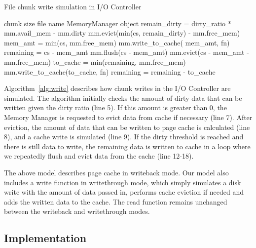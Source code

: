 \documentclass[conference]{IEEEtran}
\newcommand{\Desc}[2]{\State \makebox[2em][l]{#1}#2}
\begin{document}
    \begin{algorithm}\caption{File chunk write simulation in I/O Controller}
    \label{alg:write}
        \small
        \begin{algorithmic}[1]
        \Input
            \Desc{cs}{chunk size}
            \Desc{fn}{file name}
            \Desc{mm}{MemoryManager object}
           \EndInput
        \State remain\_dirty = dirty\_ratio * mm.avail\_mem - mm.dirty
         
            \State mm.evict(min(cs, remain\_dirty) - mm.free\_mem)
            \State mem\_amt = min(cs, mm.free\_mem)
            \State mm.write\_to\_cache( mem\_amt, fn)
        \EndIf
        \State remaining = cs - mem\_amt
          
            \State mm.flush(cs - mem\_amt)
            \State mm.evict(cs - mem\_amt  - mm.free\_mem)
            \State to\_cache = min(remaining, mm.free\_mem)
            \State mm.write\_to\_cache(to\_cache, fn)
            \State remaining = remaining - to\_cache
        \EndWhile

        \end{algorithmic}
    \end{algorithm}
    Algorithm~\ref{alg:write} describes how chunk writes in
    the I/O Controller are simulated.
    The algorithm initially checks the  amount of dirty data that
    can be written given the dirty ratio (line 5).
    If this amount is greater than 0, the Memory Manager is requested to evict
    data from cache if necessary (line 7).
    After eviction, the amount of data that can be written to
    page cache is calculated (line 8), and a cache write is simulated (line 9).
    If the dirty threshold is reached and there is still data to write,
    the remaining data is written to cache in a loop
    where we repeatedly flush and evict data from the cache (line 12-18).

    The above model describes page cache in writeback
    mode. Our model also includes a write function in writethrough mode,
    which simply simulates a disk write with the amount of data passed in,
    performs cache eviction if needed and adds the written data to the
    cache. The read function remains unchanged between the writeback and
    writethrough modes.

        \subsection{Implementation}
\end{document}

